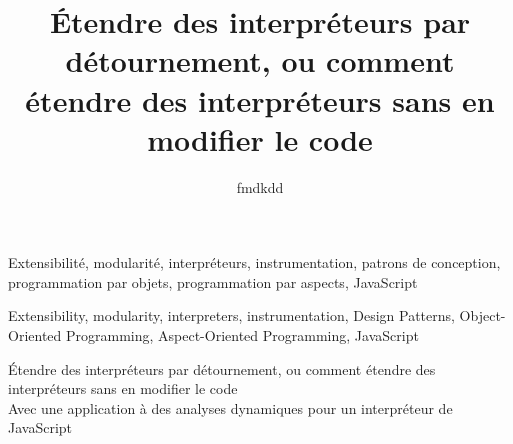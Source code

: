 

\newcommand{\titlefr}{Étendre des interpréteurs par détournement, ou comment étendre des interpréteurs sans en modifier le code}
\newcommand{\subtitlefr}{Avec une application à des analyses dynamiques pour un interpréteur de JavaScript}
\newcommand{\titleen}{Extending interpreters by diverting, or how to extend interpreters without modifying their source code}

\title{\titlefr}
\author{fmdkdd}





\begin{resume}

\end{resume}

\begin{motscles}
Extensibilité, modularité, interpréteurs, instrumentation, patrons de
conception, programmation par objets, programmation par aspects, JavaScript
\end{motscles}

\begin{abstract_}

\end{abstract_}

\begin{keywords}
Extensibility, modularity, interpreters, instrumentation, Design Patterns,
Object-Oriented Programming, Aspect-Oriented Programming, JavaScript
\end{keywords}




\frontmatter
\pagestyle{front}

\cleartorecto


\begin{flushleft}
{\LARGE\titlefr}\\
\vspace{\baselineskip}
{\Large\subtitlefr}
\end{flushleft}

